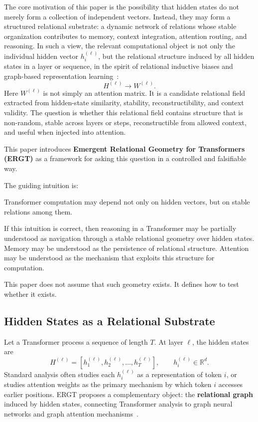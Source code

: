 \documentclass[11pt]{article}
\begin{document}
The core motivation of this paper is the possibility that hidden states do not merely form a collection of independent vectors. Instead, they may form a structured relational substrate: a dynamic network of relations whose stable organization contributes to memory, context integration, attention routing, and reasoning. In such a view, the relevant computational object is not only the individual hidden vector $h_i^{(\ell)}$, but the relational structure induced by all hidden states in a layer or sequence, in the spirit of relational inductive biases and graph-based representation learning~\cite{battaglia2018relational,bronstein2021geometric}:
\[
H^{(\ell)}
\longrightarrow
W^{(\ell)}.
\]
Here $W^{(\ell)}$ is not simply an attention matrix. It is a candidate relational field extracted from hidden-state similarity, stability, reconstructibility, and context validity. The question is whether this relational field contains structure that is non-random, stable across layers or steps, reconstructible from allowed context, and useful when injected into attention.

This paper introduces \textbf{Emergent Relational Geometry for Transformers (ERGT)} as a framework for asking this question in a controlled and falsifiable way.

The guiding intuition is:
\begin{ergtclaim}
Transformer computation may depend not only on hidden vectors, but on stable relations among them.
\end{ergtclaim}
If this intuition is correct, then reasoning in a Transformer may be partially understood as navigation through a stable relational geometry over hidden states. Memory may be understood as the persistence of relational structure. Attention may be understood as the mechanism that exploits this structure for computation.

This paper does not assume that such geometry exists. It defines how to test whether it exists.

\subsection{Hidden States as a Relational Substrate}

Let a Transformer process a sequence of length $T$. At layer $\ell$, the hidden states are
\[
H^{(\ell)}
=
[h_1^{(\ell)},h_2^{(\ell)},\ldots,h_T^{(\ell)}],
\qquad
h_i^{(\ell)}\in\mathbb{R}^d.
\]
Standard analysis often studies each $h_i^{(\ell)}$ as a representation of token $i$, or studies attention weights as the primary mechanism by which token $i$ accesses earlier positions. ERGT proposes a complementary object: the \textbf{relational graph} induced by hidden states, connecting Transformer analysis to graph neural networks and graph attention mechanisms~\cite{scarselli2009graph,kipf2017semi,velickovic2018graph}.
\end{document}
